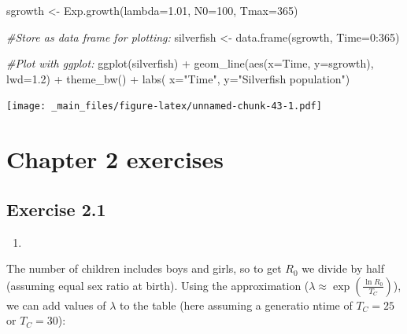 \documentclass[
]{book}
\newenvironment{Shaded}{\begin{snugshade}}{\end{snugshade}}
\newcommand{\AttributeTok}[1]{\textcolor[rgb]{0.77,0.63,0.00}{#1}}
\newcommand{\CommentTok}[1]{\textcolor[rgb]{0.56,0.35,0.01}{\textit{#1}}}
\newcommand{\DecValTok}[1]{\textcolor[rgb]{0.00,0.00,0.81}{#1}}
\newcommand{\FloatTok}[1]{\textcolor[rgb]{0.00,0.00,0.81}{#1}}
\newcommand{\FunctionTok}[1]{\textcolor[rgb]{0.00,0.00,0.00}{#1}}
\newcommand{\NormalTok}[1]{#1}
\newcommand{\OtherTok}[1]{\textcolor[rgb]{0.56,0.35,0.01}{#1}}
\newcommand{\SpecialCharTok}[1]{\textcolor[rgb]{0.00,0.00,0.00}{#1}}
\newcommand{\StringTok}[1]{\textcolor[rgb]{0.31,0.60,0.02}{#1}}
\providecommand{\tightlist}{%
  \setlength{\itemsep}{0pt}\setlength{\parskip}{0pt}}
\begin{document}
\begin{Shaded}
\begin{Highlighting}[]
\NormalTok{sgrowth }\OtherTok{\textless{}{-}} \FunctionTok{Exp.growth}\NormalTok{(}\AttributeTok{lambda=}\FloatTok{1.01}\NormalTok{, }\AttributeTok{N0=}\DecValTok{100}\NormalTok{, }\AttributeTok{Tmax=}\DecValTok{365}\NormalTok{)}

\CommentTok{\#Store as data frame for plotting:}
\NormalTok{silverfish }\OtherTok{\textless{}{-}} \FunctionTok{data.frame}\NormalTok{(sgrowth, }\AttributeTok{Time=}\DecValTok{0}\SpecialCharTok{:}\DecValTok{365}\NormalTok{)}

\CommentTok{\#Plot with ggplot:}
\FunctionTok{ggplot}\NormalTok{(silverfish) }\SpecialCharTok{+} 
    \FunctionTok{geom\_line}\NormalTok{(}\FunctionTok{aes}\NormalTok{(}\AttributeTok{x=}\NormalTok{Time, }\AttributeTok{y=}\NormalTok{sgrowth), }\AttributeTok{lwd=}\FloatTok{1.2}\NormalTok{) }\SpecialCharTok{+}
    \FunctionTok{theme\_bw}\NormalTok{() }\SpecialCharTok{+}
    \FunctionTok{labs}\NormalTok{( }\AttributeTok{x=}\StringTok{"Time"}\NormalTok{, }\AttributeTok{y=}\StringTok{"Silverfish population"}\NormalTok{)}
\end{Highlighting}
\end{Shaded}

\texttt{[image: \_main\_files/figure-latex/unnamed-chunk-43-1.pdf]}

\hypertarget{chapter-2-exercises}{%
\section{Chapter 2 exercises}\label{chapter-2-exercises}}

\hypertarget{exercise-2.1-1}{%
\subsection*{Exercise 2.1}\label{exercise-2.1-1}}

\begin{enumerate}
\def\labelenumi{\arabic{enumi}.}
\tightlist
\item
\end{enumerate}

The number of children includes boys and girls, so to get \(R_0\) we divide by half (assuming equal sex ratio at birth). Using the approximation (\(\lambda\approx \exp\left(\frac{\ln R_0}{T_C}\right)\)), we can add values of \(\lambda\) to the table (here assuming a generatio ntime of \(T_C=25\) or \(T_C=30\)):
\end{document}
